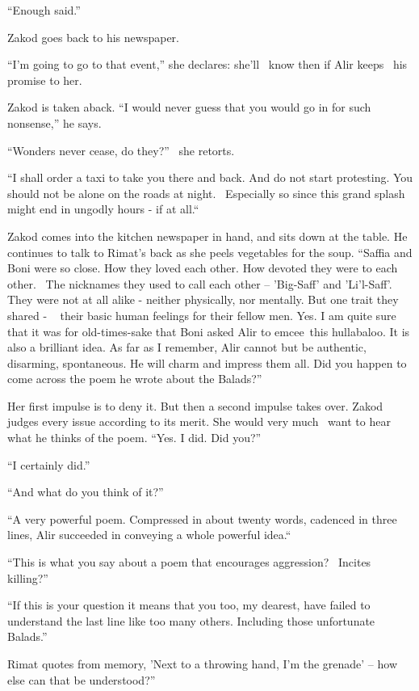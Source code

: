 \documentclass[twoside,11pt]{book}
\begin{document}
``Enough said.''

Zakod goes back to his newspaper.

``I'm going to go to that event,'' she declares: she'll \ know then if Alir keeps \ his
promise to her.{ }

Zakod is taken aback. ``I would never guess that you would go in for such nonsense,'' he says.

``Wonders never cease, do they?'' \ she retorts.

``I shall order a taxi to take you there and back. And do not start protesting. You should not be alone on
the roads at night. ~Especially so since this grand splash might end in ungodly hours - if at all.``~

Zakod comes into the kitchen newspaper in hand, and sits down at the table. He continues to talk to Rimat's back as she
peels vegetables for the soup. ``Saffia and Boni were so close. How they loved each other. How devoted
they were to each other{.} \ The nicknames they used to call each other -- 'Big-Saff' and 'Li'l-Saff'.
They were not at all alike - neither physically, nor mentally. But one trait they shared -
~{ }their basic human feelings for their fellow men. Yes. I am quite sure that
it was for old-times-sake that Boni asked Alir to emcee~this hullabaloo. It is also a brilliant idea. As far as I
remember, Alir cannot but be authentic, disarming, spontaneous. He will charm and impress them all. Did you happen to
come across the poem he wrote about the Balads?''

Her first impulse is to deny it. But then a second impulse takes over. Zakod judges every issue according to its merit.
She would very much \ want to hear what he thinks of the poem. ``Yes. I did. Did you?''

``I certainly did.''

``And what do you think of it?''

``A very powerful poem. Compressed in about twenty words, cadenced in three lines, Alir succeeded in
conveying a whole powerful idea.``~

``This is what you say about a poem that encourages aggression? ~Incites killing?''

``If this is your question it means that you too, my dearest, have failed to understand the last line like
too many others. Including those unfortunate Balads.''

Rimat quotes from memory, 'Next to a throwing hand, I'm the grenade' -- how else can that be understood?''
\end{document}
